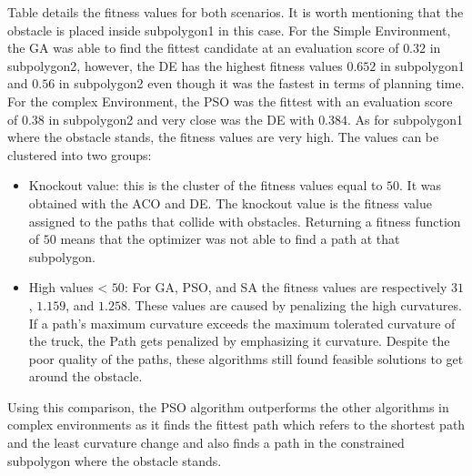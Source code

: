 Table  details the fitness values for both scenarios. It is worth mentioning
that the obstacle is placed inside subpolygon1 in this case.
For the Simple Environment, the GA was able to find the fittest candidate at an evaluation score of 
\(0.32\) in subpolygon2, however, the DE has the highest fitness values \(0.652\) in subpolygon1 and \(0.56\) in subpolygon2 
even though it was the fastest in terms of planning time.
For the complex Environment, the PSO was the fittest with an evaluation score of \(0.38\) in subpolygon2 and very 
close was the DE with \(0.384\). As for subpolygon1 where the obstacle stands, the fitness values are very high.
The values can be clustered into two groups:
\begin{itemize}
    \item Knockout value: this is the cluster of the fitness values equal to \(50\). It was obtained
    with the ACO and DE. The knockout value is the fitness value assigned to the paths that collide with obstacles.
    Returning a fitness function of \(50\) means that the optimizer was not able to find a path at that subpolygon.
    \item High values < \(50\): For GA, PSO, and SA the fitness values are respectively \(31\), \(1.159\), and \(1.258\).
    These values are caused by penalizing the high curvatures.
    If a path's maximum curvature exceeds the maximum tolerated curvature of the truck, the Path gets penalized by 
    emphasizing it curvature. Despite the poor quality of the paths, these algorithms still found feasible solutions 
    to get around the obstacle. 
\end{itemize}

Using this comparison, the PSO algorithm outperforms the other algorithms in complex environments as it 
finds the fittest path which refers to the shortest path and the least curvature change and also finds a path in 
the constrained subpolygon where the obstacle stands.

